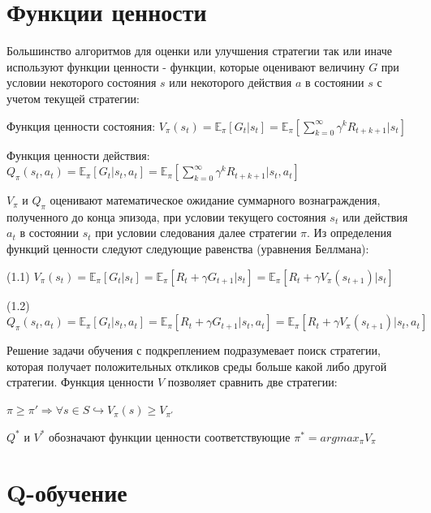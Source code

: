 \documentclass{mipt-thesis-bs}
\begin{document}
\section{Функции ценности}

Большинство алгоритмов для оценки или улучшения стратегии так или иначе используют функции ценности - функции, которые оценивают величину $G$ при условии некоторого состояния $s$ или некоторого действия $a$ в состоянии $s$ с учетом текущей стратегии:

Функция ценности состояния: $V_{\pi}(s_t) = \mathbb{E}_{\pi}[G_{t} | s_t]=\mathbb{E}_{\pi}[\sum_{k=0}^{\infty} \gamma^{k} R_{t+k+1} | s_t]$ 
 
Функция ценности действия: $Q_{\pi}(s_t, a_t) = \mathbb{E}_{\pi}[G_{t} | s_{t}, a_{t}]=\mathbb{E}_{\pi}[\sum_{k=0}^{\infty} \gamma^{k} R_{t+k+1} | s_{t}, a_{t}]$

$V_\pi$ и $Q_\pi$ оценивают математическое ожидание суммарного вознаграждения, полученного до конца эпизода, при условии текущего состояния $s_t$ или действия $a_t$ в состоянии $s_t$ при условии следования далее стратегии $\pi$. Из определения функций ценности следуют следующие равенства (уравнения Беллмана):
\begin{center}
(1.1) $V_{\pi}(s_t) = \mathbb{E}_{\pi}[G_t | s_t]=\mathbb{E}_{\pi}[R_{t} + \gamma G_{t+1}| s_t] = \mathbb{E}_{\pi}[R_{t} + \gamma V_{\pi}(s_{t+1})| s_t]$ 

(1.2) $Q_{\pi}(s_t, a_t) = \mathbb{E}_{\pi}[G_{t} | s_t, a_t]=\mathbb{E}_{\pi}[R_{t} + \gamma G_{t+1}| s_t, a_t] = \mathbb{E}_{\pi}[R_{t} + \gamma V_{\pi}(s_{t+1})| s_t, a_t]$
\end{center}

Решение задачи обучения с подкреплением подразумевает поиск стратегии, которая получает положительных откликов среды больше какой либо другой стратегии. Функция ценности $V$ позволяет сравнить две стратегии:

\begin{center}
    $\pi \geq \pi' \Rightarrow \forall s \in S \hookrightarrow V_\pi(s) \geq V_{\pi'}$
\end{center}

$Q^*$ и $V^*$ обозначают функции ценности соответствующие $\pi^*= argmax_{\pi} V_\pi$

\section{Q-обучение}
\end{document}
